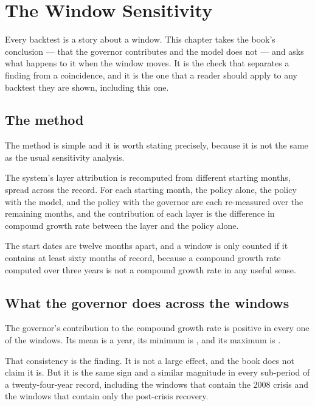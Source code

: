 
\chapter{The Window Sensitivity}
\label{ch:window}

Every backtest is a story about a window. This chapter takes the book's
conclusion --- that the governor contributes and the model does not --- and
asks what happens to it when the window moves. It is the check that
separates a finding from a coincidence, and it is the one that a reader
should apply to any backtest they are shown, including this one.

\section{The method}

The method is simple and it is worth stating precisely, because it is not
the same as the usual sensitivity analysis.

The system's layer attribution is recomputed from \numWindowCount{}
different starting months, spread across the record. For each starting
month, the policy alone, the policy with the model, and the policy with
the governor are each re-measured over the remaining months, and the
contribution of each layer is the difference in compound growth rate
between the layer and the policy alone.

The start dates are twelve months apart, and a window is only counted if
it contains at least sixty months of record, because a compound growth
rate computed over three years is not a compound growth rate in any
useful sense.

\section{What the governor does across the windows}

The governor's contribution to the compound growth rate is positive in
every one of the \numWindowCount{} windows. Its mean is \numGovMean{} a
year, its minimum is \numGovMin{}, and its maximum is \numGovMax{}.

That consistency is the finding. It is not a large effect, and the book
does not claim it is. But it is the same sign and a similar magnitude in
every sub-period of a twenty-four-year record, including the windows
that contain the 2008 crisis and the windows that contain only the
post-crisis recovery.

